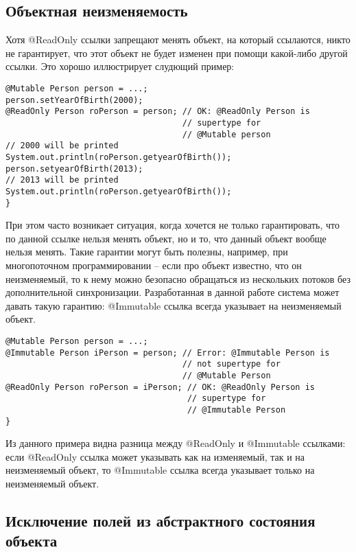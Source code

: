 \subsection{Объектная неизменяемость}

Хотя @ReadOnly ссылки запрещают менять объект, на который ссылаются, никто не гарантирует, что этот объект не будет изменен при помощи какой-либо другой ссылки. Это хорошо иллюстрирует слудющий пример:

\begin{lstlisting}[caption=Изменение объекта\, хранимого по @ReadOnly ссылке, label=code:change_ro_object]
@Mutable Person person = ...;
person.setYearOfBirth(2000);
@ReadOnly Person roPerson = person; // OK: @ReadOnly Person is 
                                    // supertype for 
                                    // @Mutable person
// 2000 will be printed
System.out.println(roPerson.getyearOfBirth());
person.setyearOfBirth(2013);
// 2013 will be printed
System.out.println(roPerson.getyearOfBirth()); 			
}
\end{lstlisting} 

При этом часто возникает ситуация, когда хочется не только гарантировать, что по данной ссылке нельзя менять объект, но и то, что данный объект вообще нельзя менять. Такие гарантии могут быть полезны, например, при многопоточном программировании -- если про объект известно, что он неизменяемый, то к нему можно безопасно обращаться из нескольких потоков без дополнительной синхронизации. Разработанная в данной работе система может давать такую гарантию: @Immutable ссылка всегда указывает на неизменяемый объект. 

\begin{lstlisting}[caption=@Mutable и @Immutable ссылки, label=code:mutable_vs_immutable]
@Mutable Person person = ...;
@Immutable Person iPerson = person; // Error: @Immutable Person is 
                                    // not supertype for 
                                    // @Mutable Person
@ReadOnly Person roPerson = iPerson; // OK: @ReadOnly Person is 
                                     // supertype for 
                                     // @Immutable Person
}
\end{lstlisting} 

Из данного примера видна разница между @ReadOnly и @Immutable ссылками: если @ReadOnly ссылка может указывать как на изменяемый, так и на неизменяемый объект, то @Immutable ссылка всегда указывает только на неизменяемый объект.  

\subsection{Исключение полей из абстрактного состояния объекта}

